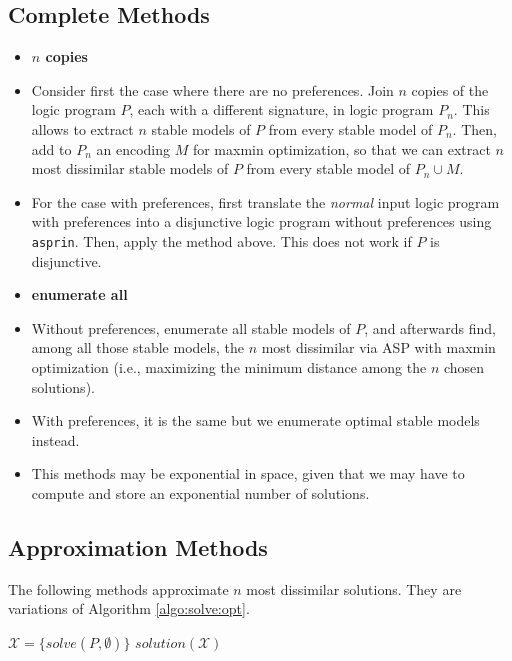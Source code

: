 \documentclass[a4paper,10pt]{article}
\begin{document}
\subsection{Complete Methods}
\begin{itemize}
\item
\textbf{$n$ copies}
\item
Consider first the case where there are no preferences.
Join $n$ copies of the logic program $P$, each with a different signature, in logic program $P_n$.
This allows to extract $n$ stable models of $P$ from every stable model of $P_n$.
Then, add to $P_n$ an encoding $M$ for maxmin optimization, 
so that we can extract $n$ most dissimilar stable models of $P$ 
from every stable model of $P_n \cup M$.
\item
For the case with preferences, 
first translate the \emph{normal} input logic program with preferences
into a disjunctive logic program without preferences using \texttt{asprin}.
Then, apply the method above.
This does not work if $P$ is disjunctive.
\item
\textbf{enumerate all}
\item
Without preferences, 
enumerate all stable models of $P$, 
and afterwards find, among all those stable models, 
the $n$ most dissimilar via ASP with maxmin optimization 
(i.e., maximizing the minimum distance among the $n$ chosen solutions).
\item
With preferences, it is the same but we enumerate optimal stable models instead.
\item
This methods may be exponential in space, given that we may have to compute and store 
an exponential number of solutions.
\end{itemize}


\subsection{Approximation Methods}
The following methods approximate $n$ most dissimilar solutions.
They are variations of Algorithm \ref{algo:solve:opt}.
\begin{algorithm}[ht]\caption{$\mathit{iterative}(P,n)$\label{algo:solve:opt}}
  \BlankLine
  $\mathcal{X} = \{ \mathit{solve}(P,\emptyset) \}$\;
  \Return $\mathit{solution}(\mathcal{X})$\;
\end{algorithm}%
\end{document}
